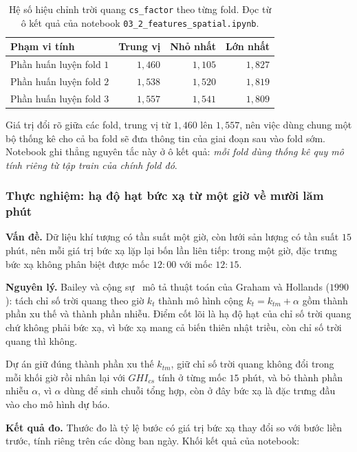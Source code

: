 \documentclass[12pt, a4paper]{report}
\begin{document}
\begin{table}[htbp]
\centering
\caption{Hệ số hiệu chỉnh trời quang \texttt{cs\_factor} theo từng fold. Đọc từ ô kết quả của
notebook \texttt{03\_2\_features\_spatial.ipynb}.}
\label{tab:cs_factor}
\small
\begin{tabular}{l r r r}
\toprule
\textbf{Phạm vi tính} & \textbf{Trung vị} & \textbf{Nhỏ nhất} & \textbf{Lớn nhất} \\
\midrule
Phần huấn luyện fold $1$ & $1{,}460$ & $1{,}105$ & $1{,}827$ \\
Phần huấn luyện fold $2$ & $1{,}538$ & $1{,}520$ & $1{,}819$ \\
Phần huấn luyện fold $3$ & $1{,}557$ & $1{,}541$ & $1{,}809$ \\
\bottomrule
\end{tabular}
\end{table}

Giá trị đổi rõ giữa các fold, trung vị từ $1{,}460$ lên $1{,}557$, nên việc dùng chung
một bộ thống kê cho cả ba fold sẽ đưa thông tin của giai đoạn sau vào fold sớm. Notebook ghi
thẳng nguyên tắc này ở ô kết quả: \textit{mỗi fold dùng thống kê quy mô tính riêng từ tập
train của chính fold đó}.

\subsubsection{Thực nghiệm: hạ độ hạt bức xạ từ một giờ về mười lăm phút}

\textbf{Vấn đề.} Dữ liệu khí tượng có tần suất một giờ, còn lưới sản lượng có tần suất $15$
phút, nên mỗi giá trị bức xạ lặp lại bốn lần liên tiếp: trong một giờ, đặc trưng bức xạ không
phân biệt được mốc $12{:}00$ với mốc $12{:}15$.

\textbf{Nguyên lý.} Bailey và cộng sự~\cite{bailey2024} mô tả thuật toán của Graham và
Hollands ($1990$): tách chỉ số trời quang theo giờ $k_t$ thành mô hình cộng
$k_t = k_{tm} + \alpha$ gồm thành phần xu thế và thành phần nhiễu. Điểm cốt lõi là hạ độ hạt của chỉ số trời quang chứ không phải bức xạ, vì bức xạ mang cả biến thiên nhật
triều, còn chỉ số trời quang thì không.

Dự án giữ đúng thành phần xu thế $k_{tm}$, giữ chỉ số trời quang không đổi trong mỗi khối
giờ rồi nhân lại với $GHI_{cs}$ tính ở từng mốc $15$ phút, và bỏ thành phần nhiễu $\alpha$,
vì $\alpha$ dùng để sinh chuỗi tổng hợp, còn ở đây bức xạ là đặc trưng đầu vào cho mô hình
dự báo.

\textbf{Kết quả đo.} Thước đo là tỷ lệ bước có giá trị bức xạ thay đổi so với bước liền
trước, tính riêng trên các dòng ban ngày. Khối kết quả của notebook:
\end{document}

